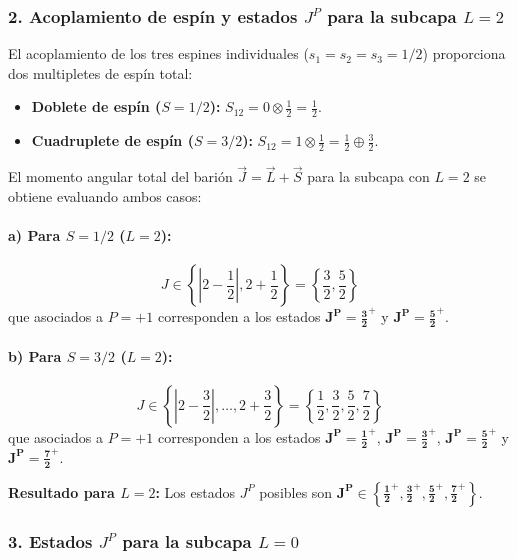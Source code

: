 \begin{problema}
\subsubsection*{2. Acoplamiento de espín y estados $J^P$ para la subcapa $L = 2$}

El acoplamiento de los tres espines individuales ($s_1 = s_2 = s_3 = 1/2$) proporciona dos multipletes de espín total:
\begin{itemize}
    \item \textbf{Doblete de espín ($S = 1/2$):} $S_{12} = 0 \otimes \frac{1}{2} = \frac{1}{2}$.
    \item \textbf{Cuadruplete de espín ($S = 3/2$):} $S_{12} = 1 \otimes \frac{1}{2} = \frac{1}{2} \oplus \frac{3}{2}$.
\end{itemize}

El momento angular total del barión $\vec{J} = \vec{L} + \vec{S}$ para la subcapa con $L = 2$ se obtiene evaluando ambos casos:

\paragraph{a) Para $S = 1/2$ ($L = 2$):}
\begin{equation*}
J \in \left\{ \left| 2 - \frac{1}{2} \right|, 2 + \frac{1}{2} \right\} = \left\{ \frac{3}{2}, \frac{5}{2} \right\}
\end{equation*}
que asociados a $P = +1$ corresponden a los estados $\mathbf{J^P = \frac{3}{2}^+}$ y $\mathbf{J^P = \frac{5}{2}^+}$.

\paragraph{b) Para $S = 3/2$ ($L = 2$):}
\begin{equation*}
J \in \left\{ \left| 2 - \frac{3}{2} \right|, \dots, 2 + \frac{3}{2} \right\} = \left\{ \frac{1}{2}, \frac{3}{2}, \frac{5}{2}, \frac{7}{2} \right\}
\end{equation*}
que asociados a $P = +1$ corresponden a los estados $\mathbf{J^P = \frac{1}{2}^+}$, $\mathbf{J^P = \frac{3}{2}^+}$, $\mathbf{J^P = \frac{5}{2}^+}$ y $\mathbf{J^P = \frac{7}{2}^+}$.

\textbf{Resultado para $L = 2$:} Los estados $J^P$ posibles son $\mathbf{J^P \in \left\{ \frac{1}{2}^+, \frac{3}{2}^+, \frac{5}{2}^+, \frac{7}{2}^+ \right\}}$.

\subsubsection*{3. Estados $J^P$ para la subcapa $L = 0$}


\end{problema}
